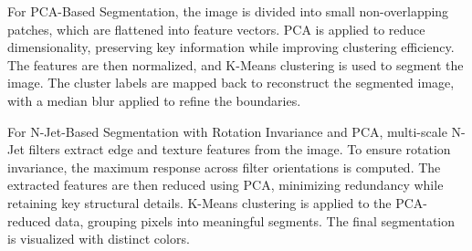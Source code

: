 \documentclass[12pt]{article}
\begin{document}
For PCA-Based Segmentation, the image is divided into small non-overlapping patches, which are flattened into feature vectors. PCA is applied to reduce dimensionality, preserving key information while improving clustering efficiency. The features are then normalized, and K-Means clustering is used to segment the image. The cluster labels are mapped back to reconstruct the segmented image, with a median blur applied to refine the boundaries.

For N-Jet-Based Segmentation with Rotation Invariance and PCA, multi-scale N-Jet filters extract edge and texture features from the image. To ensure rotation invariance, the maximum response across filter orientations is computed. The extracted features are then reduced using PCA, minimizing redundancy while retaining key structural details. K-Means clustering is applied to the PCA-reduced data, grouping pixels into meaningful segments. The final segmentation is visualized with distinct colors.
\end{document}
